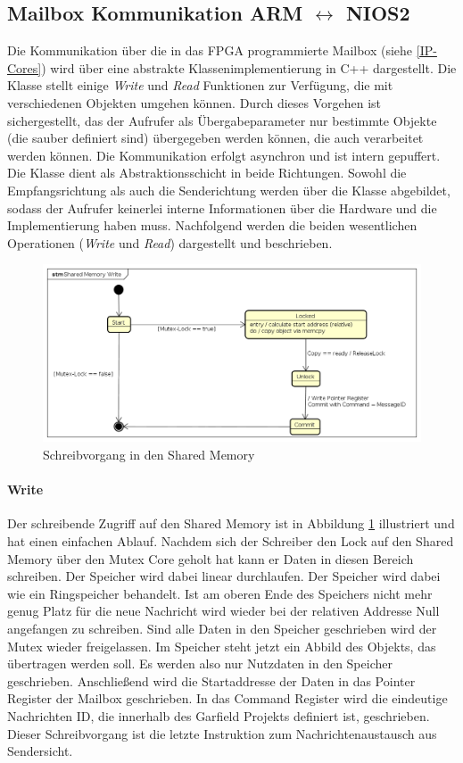 \subsection{Mailbox Kommunikation ARM $\leftrightarrow$ NIOS2}
Die Kommunikation über die in das \ac{FPGA} programmierte Mailbox (siehe \ref{IP-Cores}) wird über eine abstrakte Klassenimplementierung in C++ dargestellt. 
Die Klasse stellt einige \textit{Write} und \textit{Read} Funktionen zur Verfügung, die mit verschiedenen Objekten umgehen können. Durch dieses Vorgehen ist sichergestellt, das der Aufrufer als Übergabeparameter nur bestimmte Objekte (die sauber definiert sind) übergegeben werden können, die auch verarbeitet werden können. Die Kommunikation erfolgt asynchron und ist intern gepuffert. Die Klasse dient als Abstraktionsschicht in beide Richtungen. Sowohl die Empfangsrichtung als auch die Senderichtung werden über die Klasse abgebildet, sodass der Aufrufer keinerlei interne Informationen über die Hardware und die Implementierung haben muss.
Nachfolgend werden die beiden wesentlichen Operationen (\textit{Write} und \textit{Read}) dargestellt und beschrieben.

\begin{figure}
	\includegraphics[width=\textwidth]{Abb/Shared_mem_Write.png}
	\caption{Schreibvorgang in den Shared Memory}
	\label{Software:Arm:SharedMemWrite}
\end{figure}

\paragraph{Write}
Der schreibende Zugriff auf den Shared Memory ist in Abbildung \ref{Software:Arm:SharedMemWrite} illustriert und hat einen einfachen Ablauf. Nachdem sich der Schreiber den Lock auf den Shared Memory über den Mutex Core geholt hat kann er Daten in diesen Bereich schreiben. Der Speicher wird dabei linear durchlaufen. Der Speicher wird dabei wie ein Ringspeicher behandelt. Ist am oberen Ende des Speichers nicht mehr genug Platz für die neue Nachricht wird wieder bei der relativen Addresse Null angefangen zu schreiben. Sind alle Daten in den Speicher geschrieben wird der Mutex wieder freigelassen. Im Speicher steht jetzt ein Abbild des Objekts, das übertragen werden soll. Es werden also nur Nutzdaten in den Speicher geschrieben. Anschließend wird die Startaddresse der Daten in das Pointer Register der Mailbox geschrieben. In das Command Register wird die eindeutige Nachrichten ID, die innerhalb des Garfield Projekts definiert ist, geschrieben. Dieser Schreibvorgang ist die letzte Instruktion zum Nachrichtenaustausch aus Sendersicht.

